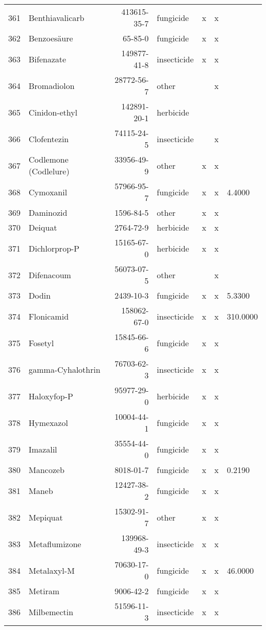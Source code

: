 \begin{longtable}{lp{3cm}rlp{0.5cm}p{0.5cm}p{1.5cm}}
  361 & Benthiavalicarb & 413615-35-7 & fungicide & x & x &  \\ 
  362 & Benzoesäure & 65-85-0 & fungicide & x & x &  \\ 
  363 & Bifenazate & 149877-41-8 & insecticide & x & x &  \\ 
  364 & Bromadiolon & 28772-56-7 & other &  & x &  \\ 
  365 & Cinidon-ethyl & 142891-20-1 & herbicide &  &  &  \\ 
  366 & Clofentezin & 74115-24-5 & insecticide &  & x &  \\ 
  367 & Codlemone (Codlelure) & 33956-49-9 & other & x & x &  \\ 
  368 & Cymoxanil & 57966-95-7 & fungicide & x & x & 4.4000 \\ 
  369 & Daminozid & 1596-84-5 & other & x & x &  \\ 
  370 & Deiquat & 2764-72-9 & herbicide & x & x &  \\ 
  371 & Dichlorprop-P & 15165-67-0 & herbicide & x & x &  \\ 
  372 & Difenacoum & 56073-07-5 & other &  & x &  \\ 
  373 & Dodin & 2439-10-3 & fungicide & x & x & 5.3300 \\ 
  374 & Flonicamid & 158062-67-0 & insecticide & x & x & 310.0000 \\ 
  375 & Fosetyl & 15845-66-6 & fungicide & x & x &  \\ 
  376 & gamma-Cyhalothrin & 76703-62-3 & insecticide & x & x &  \\ 
  377 & Haloxyfop-P & 95977-29-0 & herbicide & x & x &  \\ 
  378 & Hymexazol & 10004-44-1 & fungicide & x & x &  \\ 
  379 & Imazalil & 35554-44-0 & fungicide & x & x &  \\ 
  380 & Mancozeb & 8018-01-7 & fungicide & x & x & 0.2190 \\ 
  381 & Maneb & 12427-38-2 & fungicide & x & x &  \\ 
  382 & Mepiquat & 15302-91-7 & other & x & x &  \\ 
  383 & Metaflumizone & 139968-49-3 & insecticide & x & x &  \\ 
  384 & Metalaxyl-M & 70630-17-0 & fungicide & x & x & 46.0000 \\ 
  385 & Metiram & 9006-42-2 & fungicide & x & x &  \\ 
  386 & Milbemectin & 51596-11-3 & insecticide & x & x &  \\ 

\end{longtable}
